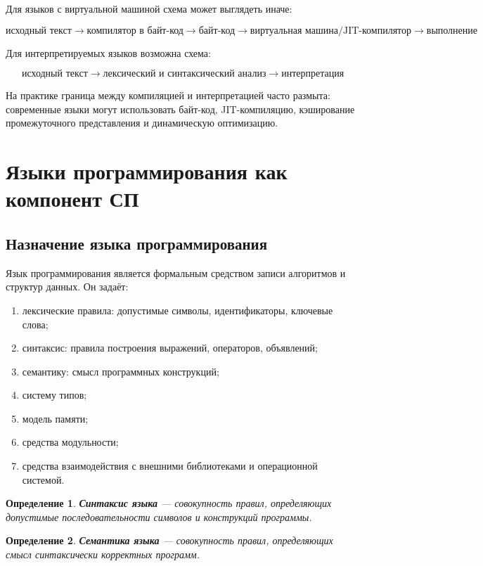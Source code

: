 \documentclass[12pt,a4paper]{article}
\newtheorem{definition}{Определение}
\begin{document}
Для языков с виртуальной машиной схема может выглядеть иначе:

\[
\text{исходный текст}
\longrightarrow
\text{компилятор в байт-код}
\longrightarrow
\text{байт-код}
\longrightarrow
\text{виртуальная машина/JIT-компилятор}
\longrightarrow
\text{выполнение}
\]

Для интерпретируемых языков возможна схема:

\[
\text{исходный текст}
\longrightarrow
\text{лексический и синтаксический анализ}
\longrightarrow
\text{интерпретация}
\]

На практике граница между компиляцией и интерпретацией часто размыта: современные языки могут использовать байт-код, JIT-компиляцию, кэширование промежуточного представления и динамическую оптимизацию.

\section{Языки программирования как компонент СП}

\subsection{Назначение языка программирования}

Язык программирования является формальным средством записи алгоритмов и структур данных. Он задаёт:
\begin{enumerate}
  \item лексические правила: допустимые символы, идентификаторы, ключевые слова;
  \item синтаксис: правила построения выражений, операторов, объявлений;
  \item семантику: смысл программных конструкций;
  \item систему типов;
  \item модель памяти;
  \item средства модульности;
  \item средства взаимодействия с внешними библиотеками и операционной системой.
\end{enumerate}

\begin{definition}
\textbf{Синтаксис языка} --- совокупность правил, определяющих допустимые последовательности символов и конструкций программы.
\end{definition}

\begin{definition}
\textbf{Семантика языка} --- совокупность правил, определяющих смысл синтаксически корректных программ.
\end{definition}
\end{document}

